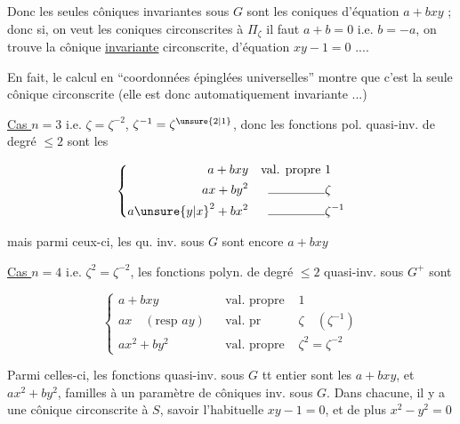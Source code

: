 Donc les seules côniques invariantes sous $G$ sont les coniques d'équation $a+bxy$ ; donc si, on veut les coniques circonscrites à $\Pi_\zeta$ il faut $a+b=0$ i.e. $b=-a$, on trouve la  cônique \uline{invariante} circonscrite, d'équation $xy-1=0$ ....


En fait, le calcul en ``coordonnées épinglées universelles'' montre que c'est la seule cônique circonscrite (elle est donc automatiquement invariante ...)

\uline{Cas $n=3$} i.e. $\zeta=\zeta^{-2}$, $\zeta^{-1}=\zeta^{\unsure{2|1}}$, donc les fonctions pol. quasi-inv.  de degré $\leq2$ sont les

\[\left\{\begin{aligned}
a+bxy&&\text{val. propre }&1\\
ax+by^2&&\rule{1.6cm}{.35pt}&\zeta\\
a{\unsure{y|x}}^2+bx^2&&\rule{1.6cm}{.35pt}&\zeta^{-1}
\end{aligned}\right.\]

mais parmi ceux-ci, les qu. inv. sous $G$ sont encore $a+bxy$

\uline{Cas $n=4$} i.e. $\zeta^2=\zeta^{-2}$, les fonctions polyn. de degré $\leq2$ quasi-inv. sous $G^+$  sont

\[\left\{\begin{aligned}
a+bxy&&\text{val. propre }&1\\
ax\quad(\text{resp }ay)&&\text{val. pr }&\zeta\quad(\zeta^{-1})\\
ax^2+by^2&&\text{val. propre }&\zeta^2=\zeta^{-2}
\end{aligned}\right.\]

Parmi celles-ci, les fonctions quasi-inv. sous $G$ tt entier sont les $a+bxy$, et  $ax^2+by^2$,  familles à un paramètre de côniques inv. sous $G$. Dans chacune, il y a  une cônique circonscrite à $S$, savoir l'habituelle $xy-1=0$, et de plus $x^2-y^2=0$

